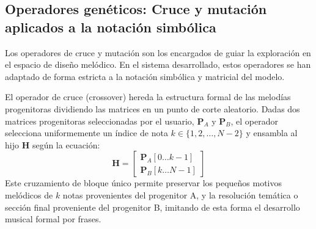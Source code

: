 \documentclass[12pt]{report}
\begin{document}
\subsection{Operadores genéticos: Cruce y mutación aplicados a la notación simbólica}

Los operadores de cruce y mutación son los encargados de guiar la exploración en el espacio de diseño melódico. En el sistema desarrollado, estos operadores se han adaptado de forma estricta a la notación simbólica y matricial del modelo.

El operador de cruce (crossover) hereda la estructura formal de las melodías progenitoras dividiendo las matrices en un punto de corte aleatorio. Dadas dos matrices progenitoras seleccionadas por el usuario, $\mathbf{P}_A$ y $\mathbf{P}_B$, el operador selecciona uniformemente un índice de nota $k \in \{1, 2, \dots, N-2\}$ y ensambla al hijo $\mathbf{H}$ según la ecuación:
\begin{equation}
    \mathbf{H} = \begin{bmatrix} \mathbf{P}_A[0 \dots k-1] \\ \mathbf{P}_B[k \dots N-1] \end{bmatrix}
\end{equation}
Este cruzamiento de bloque único permite preservar los pequeños motivos melódicos de $k$ notas provenientes del progenitor A, y la resolución temática o sección final proveniente del progenitor B, imitando de esta forma el desarrollo musical formal por frases.
\end{document}
